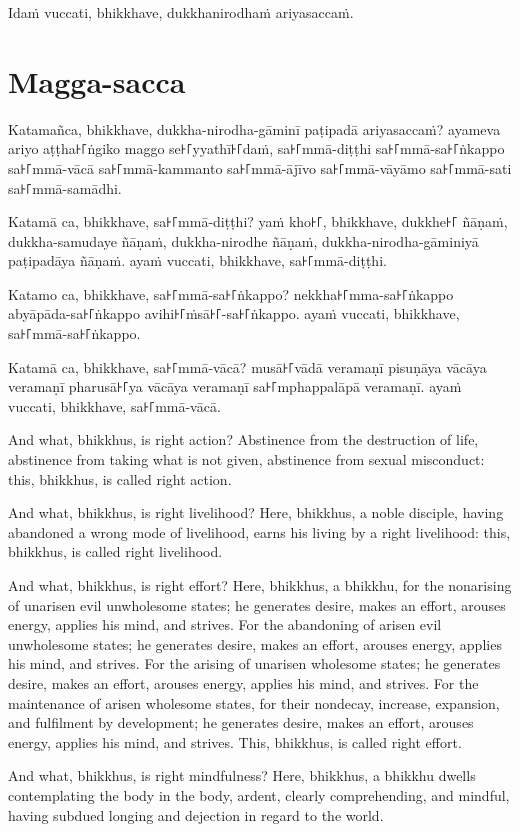 Idaṁ vuccati, bhikkhave, dukkhanirodhaṁ ariyasaccaṁ.

\section*{Magga-sacca}

Katamañca, bhikkhave, dukkha-nirodha-gāminī paṭipadā ariyasaccaṁ? ayameva ariyo
aṭṭha꜔꜒ṅgiko maggo se꜔꜒yyathī꜔꜒daṁ, sa꜔꜒mmā-diṭṭhi sa꜔꜒mmā-sa꜔꜒ṅkappo sa꜔꜒mmā-vācā
sa꜔꜒mmā-kammanto sa꜔꜒mmā-ājīvo sa꜔꜒mmā-vāyāmo sa꜔꜒mmā-sati sa꜔꜒mmā-samādhi.

Katamā ca, bhikkhave, sa꜔꜒mmā-diṭṭhi? yaṁ kho꜔꜒, bhikkhave, dukkhe꜔꜒ ñāṇaṁ,
dukkha-samudaye ñāṇaṁ, dukkha-nirodhe ñāṇaṁ, dukkha-nirodha-gāminiyā paṭipadāya
ñāṇaṁ. ayaṁ vuccati, bhikkhave, sa꜔꜒mmā-diṭṭhi.

Katamo ca, bhikkhave, sa꜔꜒mmā-sa꜔꜒ṅkappo? nekkha꜔꜒mma-sa꜔꜒ṅkappo abyāpāda-sa꜔꜒ṅkappo
avihi꜔꜒ṁsā꜔꜒-sa꜔꜒ṅkappo. ayaṁ vuccati, bhikkhave, sa꜔꜒mmā-sa꜔꜒ṅkappo.

Katamā ca, bhikkhave, sa꜔꜒mmā-vācā? musā꜔꜒vādā veramaṇī pisuṇāya vācāya veramaṇī
pharusā꜔꜒ya vācāya veramaṇī sa꜔꜒mphappalāpā veramaṇī. ayaṁ vuccati, bhikkhave,
sa꜔꜒mmā-vācā.

\englishPage

And what, bhikkhus, is right action? Abstinence from the destruction of life,
abstinence from taking what is not given, abstinence from sexual misconduct:
this, bhikkhus, is called right action.

And what, bhikkhus, is right livelihood? Here, bhikkhus, a noble disciple,
having abandoned a wrong mode of livelihood, earns his living by a right
livelihood: this, bhikkhus, is called right livelihood.

And what, bhikkhus, is right effort? Here, bhikkhus, a bhikkhu, for the
nonarising of unarisen evil unwholesome states; he generates desire, makes an
effort, arouses energy, applies his mind, and strives. For the abandoning of
arisen evil unwholesome states; he generates desire, makes an effort, arouses
energy, applies his mind, and strives. For the arising of unarisen wholesome
states; he generates desire, makes an effort, arouses energy, applies his mind,
and strives. For the maintenance of arisen wholesome states, for their nondecay,
increase, expansion, and fulfilment by development; he generates desire, makes
an effort, arouses energy, applies his mind, and strives. This, bhikkhus, is
called right effort.

And what, bhikkhus, is right mindfulness? Here, bhikkhus, a bhikkhu dwells
contemplating the body in the body, ardent, clearly comprehending, and mindful,
having subdued longing and dejection in regard to the world.

